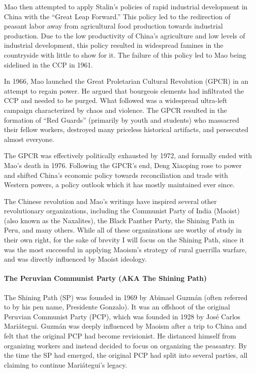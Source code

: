 Mao then attempted to apply Stalin's policies of rapid industrial development in China with the ``Great Leap Forward.'' This policy led to the redirection of peasant labor away from agricultural food production towards industrial production. Due to the low productivity of China's agriculture and low levels of industrial development, this policy resulted in widespread famines in the countryside with little to show for it. The failure of this policy led to Mao being sidelined in the CCP in 1961.

In 1966, Mao launched the Great Proletarian Cultural Revolution (GPCR) in an attempt to regain power. He argued that bourgeois elements had infiltrated the CCP and needed to be purged. What followed was a widespread ultra-left campaign characterized by chaos and violence. The GPCR resulted in the formation of ``Red Guards'' (primarily by youth and students) who massacred their fellow workers, destroyed many priceless historical artifacts, and persecuted almost everyone.

The GPCR was effectively politically exhausted by 1972, and formally ended with Mao's death in 1976. Following the GPCR's end, Deng Xiaoping rose to power and shifted China's economic policy towards reconciliation and trade with Western powers, a policy outlook which it has mostly maintained ever since.

The Chinese revolution and Mao's writings have inspired several other revolutionary organizations, including the Communist Party of India (Maoist) (also known as the Naxalites), the Black Panther Party, the Shining Path in Peru, and many others. While all of these organizations are worthy of study in their own right, for the sake of brevity I will focus on the Shining Path, since it was the most successful in applying Maoism's strategy of rural guerrilla warfare, and was directly influenced by Maoist ideology.

\paragraph{The Peruvian Communist Party (AKA The Shining Path)}

The Shining Path (SP) was founded in 1969 by Abimael Guzm\'{a}n (often referred to by his pen name, Presidente Gonzalo). It was an offshoot of the original Peruvian Communist Party (PCP), which was founded in 1928 by Jos\'{e} Carlos Mari\'{a}tegui. Guzm\'{a}n was deeply influenced by Maoism after a trip to China and felt that the original PCP had become revisionist. He distanced himself from organizing workers and instead decided to focus on organizing the peasantry. By the time the SP had emerged, the original PCP had split into several parties, all claiming to continue Mari\'{a}tegui's legacy.

